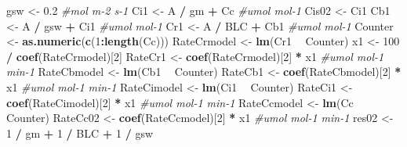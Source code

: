 \documentclass[
]{krantz}
\makeatletter
\newenvironment{Shaded}{\begin{snugshade}}{\end{snugshade}}
\newcommand{\CommentTok}[1]{\textcolor[rgb]{0.56,0.35,0.01}{\textit{#1}}}
\newcommand{\DecValTok}[1]{\textcolor[rgb]{0.00,0.00,0.81}{#1}}
\newcommand{\FloatTok}[1]{\textcolor[rgb]{0.00,0.00,0.81}{#1}}
\newcommand{\KeywordTok}[1]{\textcolor[rgb]{0.13,0.29,0.53}{\textbf{#1}}}
\newcommand{\NormalTok}[1]{#1}
\newcommand{\OperatorTok}[1]{\textcolor[rgb]{0.81,0.36,0.00}{\textbf{#1}}}
\newcommand{\StringTok}[1]{\textcolor[rgb]{0.31,0.60,0.02}{#1}}
\newenvironment{kframe}{%
\medskip{}
\setlength{\fboxsep}{.8em}
 \def\at@end@of@kframe{}%
 \ifinner\ifhmode%
  \def\at@end@of@kframe{\end{minipage}}%
  \begin{minipage}{\columnwidth}%
 \fi\fi%
 \def\FrameCommand##1{\hskip\@totalleftmargin \hskip-\fboxsep
 \colorbox{shadecolor}{##1}\hskip-\fboxsep
     \hskip-\linewidth \hskip-\@totalleftmargin \hskip\columnwidth}%
 \MakeFramed {\advance\hsize-\width
   \@totalleftmargin\z@ \linewidth\hsize
   \@setminipage}}%
 {\par\unskip\endMakeFramed%
 \at@end@of@kframe}
\renewenvironment{Shaded}{\begin{kframe}}{\end{kframe}}
\makeatother
\begin{document}
\begin{Shaded}
\begin{Highlighting}[]
\NormalTok{gsw <-}\StringTok{ }\FloatTok{0.2} \CommentTok{#mol m-2 s-1}
\NormalTok{Ci1 <-}\StringTok{ }\NormalTok{A }\OperatorTok{/}\StringTok{ }\NormalTok{gm }\OperatorTok{+}\StringTok{ }\NormalTok{Cc }\CommentTok{#umol mol-1}
\NormalTok{Cis02 <-}\StringTok{ }\NormalTok{Ci1}
\NormalTok{Cb1 <-}\StringTok{ }\NormalTok{A }\OperatorTok{/}\StringTok{ }\NormalTok{gsw }\OperatorTok{+}\StringTok{ }\NormalTok{Ci1 }\CommentTok{#umol mol-1}
\NormalTok{Cr1 <-}\StringTok{ }\NormalTok{A }\OperatorTok{/}\StringTok{ }\NormalTok{BLC }\OperatorTok{+}\StringTok{ }\NormalTok{Cb1 }\CommentTok{#umol mol-1}
\NormalTok{Counter <-}\StringTok{ }\KeywordTok{as.numeric}\NormalTok{(}\KeywordTok{c}\NormalTok{(}\DecValTok{1}\OperatorTok{:}\KeywordTok{length}\NormalTok{(Cc)))}
\NormalTok{RateCrmodel <-}\StringTok{ }\KeywordTok{lm}\NormalTok{(Cr1 }\OperatorTok{~}\StringTok{ }\NormalTok{Counter)}
\NormalTok{x1 <-}\StringTok{ }\DecValTok{100} \OperatorTok{/}\StringTok{ }\KeywordTok{coef}\NormalTok{(RateCrmodel)[}\DecValTok{2}\NormalTok{]}
\NormalTok{RateCr1 <-}\StringTok{ }\KeywordTok{coef}\NormalTok{(RateCrmodel)[}\DecValTok{2}\NormalTok{] }\OperatorTok{*}\StringTok{ }\NormalTok{x1 }\CommentTok{#umol mol-1 min-1}
\NormalTok{RateCbmodel <-}\StringTok{ }\KeywordTok{lm}\NormalTok{(Cb1 }\OperatorTok{~}\StringTok{ }\NormalTok{Counter)}
\NormalTok{RateCb1 <-}\StringTok{ }\KeywordTok{coef}\NormalTok{(RateCbmodel)[}\DecValTok{2}\NormalTok{] }\OperatorTok{*}\StringTok{ }\NormalTok{x1 }\CommentTok{#umol mol-1 min-1}
\NormalTok{RateCimodel <-}\StringTok{ }\KeywordTok{lm}\NormalTok{(Ci1 }\OperatorTok{~}\StringTok{ }\NormalTok{Counter)}
\NormalTok{RateCi1 <-}\StringTok{ }\KeywordTok{coef}\NormalTok{(RateCimodel)[}\DecValTok{2}\NormalTok{] }\OperatorTok{*}\StringTok{ }\NormalTok{x1 }\CommentTok{#umol mol-1 min-1}
\NormalTok{RateCcmodel <-}\StringTok{ }\KeywordTok{lm}\NormalTok{(Cc }\OperatorTok{~}\StringTok{ }\NormalTok{Counter)}
\NormalTok{RateCc02 <-}\StringTok{ }\KeywordTok{coef}\NormalTok{(RateCcmodel)[}\DecValTok{2}\NormalTok{] }\OperatorTok{*}\StringTok{ }\NormalTok{x1 }\CommentTok{#umol mol-1 min-1}
\NormalTok{res02 <-}\StringTok{ }\DecValTok{1} \OperatorTok{/}\StringTok{ }\NormalTok{gm }\OperatorTok{+}\StringTok{ }\DecValTok{1} \OperatorTok{/}\StringTok{ }\NormalTok{BLC }\OperatorTok{+}\StringTok{ }\DecValTok{1} \OperatorTok{/}\StringTok{ }\NormalTok{gsw}


\end{Highlighting}
\end{Shaded}
\end{document}
